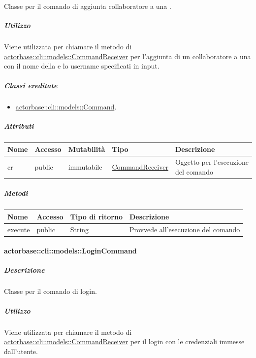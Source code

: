 \documentclass{scalatekids-article}
\begin{document}
Classe per il comando di aggiunta collaboratore a una .

\subparagraph{Utilizzo}

Viene utilizzata per chiamare il metodo di
\hyperref[sec:actorbase::cli::models::CommandReceiver]{actorbase::cli::models::CommandReceiver} per l'aggiunta di un collaboratore a
una  con il nome della  e lo username specificati
in input.

\subparagraph{Classi ereditate}

\begin{itemize}
\item \hyperref[sec:actorbase::cli::models::Command]{actorbase::cli::models::Command}.
\end{itemize}

\subparagraph{Attributi}

\begin{tabular}{| p{1cm} | p{1.5cm} | p{2cm} | p{4cm} | p{8.5cm} |}
  \hline
  Nome & Accesso & Mutabilità & Tipo & Descrizione\\
  \hline
  cr & public & immutabile & \hyperref[sec:actorbase::cli::models::CommandReceiver]{CommandReceiver} & Oggetto per l'esecuzione del comando\\
  \hline
\end{tabular}

\subparagraph{Metodi}

\begin{tabular}{| l | l | l | l |}
  \hline
  Nome & Accesso & Tipo di ritorno & Descrizione\\
  \hline
  execute & public & String & Provvede all'esecuzione del comando\\
  \hline
\end{tabular}

\paragraph{actorbase::cli::models::LoginCommand}
\label{sec:actorbase::cli::models::LoginCommand}

\subparagraph{Descrizione}

Classe per il comando di login.

\subparagraph{Utilizzo}

Viene utilizzata per chiamare il metodo di
\hyperref[sec:actorbase::cli::models::CommandReceiver]{actorbase::cli::models::CommandReceiver} per il login con le credenziali
immesse dall'utente.
\end{document}
